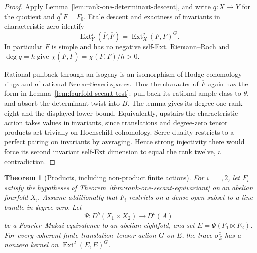 \documentclass[11pt]{article}
\newtheorem{theorem}{Theorem}[section]
\theoremstyle{definition}
\theoremstyle{remark}
\begin{document}
\begin{proof}
Apply Lemma~\ref{lem:rank-one-determinant-descent}, and write
$q:X\to Y$ for the quotient and $q^*\overline F=F_0$.
Etale descent and exactness of invariants in characteristic zero
identify
\[
 \operatorname{Ext}^j_Y(\overline F,\overline F)
       =\operatorname{Ext}^j_X(F,F)^G.
\]
In particular $\overline F$ is simple and has no negative self-Ext.
Riemann--Roch and $\deg q=h$ give
$\chi(\overline F,\overline F)=\chi(F,F)/h>0$.

Rational pullback through an isogeny is an isomorphism of Hodge
cohomology rings and of rational Neron--Severi spaces.  Thus the
character of $\overline F$ again has the form in
Lemma~\ref{lem:fourfold-secant-test}: pull back its rational ample
class to $\theta$, and absorb the determinant twist into $B$.
The lemma gives its degree-one rank eight and the displayed lower
bound.  Equivalently, upstairs the characteristic action takes
values in invariants, since translations and degree-zero tensor
products act trivially on Hochschild cohomology.  Serre duality
restricts to a perfect pairing on invariants by averaging.  Hence
strong injectivity there would force its second invariant self-Ext
dimension to equal the rank twelve, a contradiction.
\end{proof}

\begin{theorem}[Products, including non-product finite actions]
\label{thm:rank-one-secant-products}
For $i=1,2$, let $F_i$ satisfy the hypotheses of
Theorem~\ref{thm:rank-one-secant-equivariant} on an abelian fourfold
$X_i$.  Assume additionally that $F_i$ restricts on a dense open
subset to a line bundle in degree zero.  Let
\[
 \Psi:D^b(X_1\times X_2)\longrightarrow D^b(A)
\]
be a Fourier--Mukai equivalence to an abelian eightfold, and set
$E=\Psi(F_1\boxtimes F_2)$.  For every coherent finite
translation--tensor action $G$ on $E$, the trace
$\sigma_E^2$ has a nonzero kernel on
$\operatorname{Ext}^2(E,E)^G$.
\end{theorem}
\end{document}
